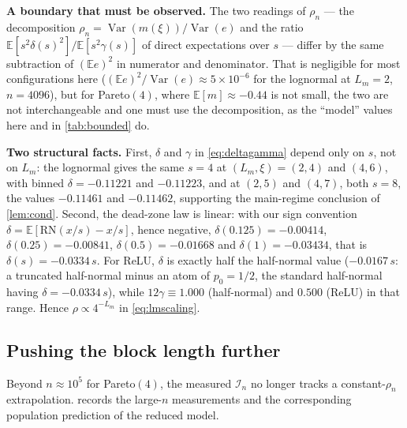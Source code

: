 \documentclass[review,hidelinks,oneeqnum,onetabnum,onefignum,onethmnum]{siamart251216}
\begin{document}
\medskip
\noindent\textbf{A boundary that must be observed.} The two readings of $\rho_n$
--- the decomposition $\rho_n=\operatorname{Var}(m(\xi))/\operatorname{Var}(e)$
and the ratio $\mathbb E[s^2\delta(s)^2]/\mathbb E[s^2\gamma(s)]$ of direct
expectations over $s$ --- differ by the same subtraction of $(\mathbb E e)^2$ in
numerator and denominator. That is negligible for most configurations here
($(\mathbb E e)^2/\operatorname{Var}(e)\approx5\times10^{-6}$ for the lognormal at
$L_m=2$, $n=4096$), but for Pareto$(4)$, where
$\mathbb E[m]\approx-0.44$ is not small, the two are not interchangeable and one
must use the decomposition, as the ``model'' values here and in
\cref{tab:bounded} do.

\medskip
\noindent\textbf{Two structural facts.} First, $\delta$ and $\gamma$ in
\cref{eq:deltagamma} depend only on $s$, not on $L_m$: the lognormal gives the
same $s=4$ at $(L_m,\xi)=(2,4)$ and $(4,6)$, with binned
$\delta=-0.11221$ and $-0.11223$, and at $(2,5)$ and $(4,7)$, both $s=8$, the
values $-0.11461$ and $-0.11462$, supporting the main-regime conclusion of
\cref{lem:cond}. Second, the dead-zone law is linear: with our sign convention
$\delta=\mathbb{E}[\mathrm{RN}(x/s)-x/s]$, hence negative,
$\delta(0.125)=-0.00414$, $\delta(0.25)=-0.00841$, $\delta(0.5)=-0.01668$ and
$\delta(1)=-0.03434$, that is $\delta(s)=-0.0334\,s$. For ReLU, $\delta$ is
exactly half the half-normal value ($-0.0167\,s$: a truncated half-normal minus
an atom of $p_0=1/2$, the standard half-normal having
$\delta=-0.0334\,s$), while $12\gamma\equiv1.000$ (half-normal) and
$0.500$ (ReLU) in that range. Hence $\rho\propto4^{-L_m}$ in
\cref{eq:lmscaling}.

\subsection{Pushing the block length further}
\label{sec:inflbig}

Beyond $n\approx10^5$ for Pareto$(4)$, the measured $\mathcal I_n$ no longer
tracks a constant-$\rho_n$ extrapolation.  records the large-$n$
measurements and the corresponding population prediction of the reduced model.
\end{document}

